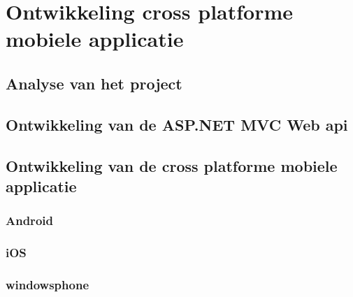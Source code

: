 \chapter{Ontwikkeling cross platforme mobiele applicatie}
\label{ch:ontwikkelingkcrossplatformapp}
\section{Analyse van het project}
\section{Ontwikkeling van de ASP.NET MVC Web api}
\section{Ontwikkeling van de cross platforme mobiele applicatie}
\subsection{Android}
\subsection{iOS}
\subsection{windowsphone}
